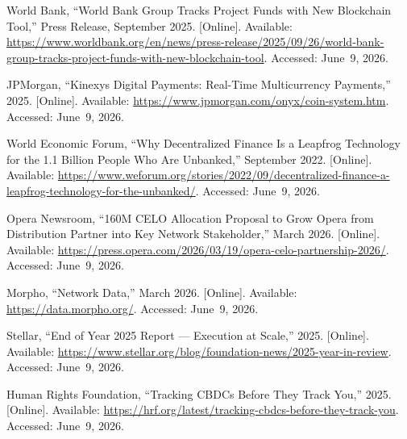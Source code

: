 \documentclass[12pt,a4paper]{report}
\begin{document}
{\begin{enumerate}[label={[\arabic*]}]
\item World Bank, ``World Bank Group Tracks Project Funds with New Blockchain Tool,'' Press Release, September 2025. [Online]. Available: \url{https://www.worldbank.org/en/news/press-release/2025/09/26/world-bank-group-tracks-project-funds-with-new-blockchain-tool}. Accessed: June~9, 2026.

\item JPMorgan, ``Kinexys Digital Payments: Real-Time Multicurrency Payments,'' 2025. [Online]. Available: \url{https://www.jpmorgan.com/onyx/coin-system.htm}. Accessed: June~9, 2026.

\item World Economic Forum, ``Why Decentralized Finance Is a Leapfrog Technology for the 1.1 Billion People Who Are Unbanked,'' September 2022. [Online]. Available: \url{https://www.weforum.org/stories/2022/09/decentralized-finance-a-leapfrog-technology-for-the-unbanked/}. Accessed: June~9, 2026.
\item Opera Newsroom, ``160M CELO Allocation Proposal to Grow Opera from Distribution Partner into Key Network Stakeholder,'' March 2026. [Online]. Available: \url{https://press.opera.com/2026/03/19/opera-celo-partnership-2026/}. Accessed: June~9, 2026.

\item Morpho, ``Network Data,'' March 2026. [Online]. Available: \url{https://data.morpho.org/}. Accessed: June~9, 2026.

\item Stellar, ``End of Year 2025 Report --- Execution at Scale,'' 2025. [Online]. Available: \url{https://www.stellar.org/blog/foundation-news/2025-year-in-review}. Accessed: June~9, 2026.

\item Human Rights Foundation, ``Tracking CBDCs Before They Track You,'' 2025. [Online]. Available: \url{https://hrf.org/latest/tracking-cbdcs-before-they-track-you}. Accessed: June~9, 2026.


\end{enumerate}}
\end{document}
